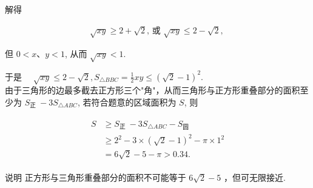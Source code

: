 \documentclass[10pt]{article}
\begin{document}
解得

\begin{align*}
\sqrt{x y} \geqslant 2+\sqrt{2} \text {, 或 } \sqrt{x y} \leqslant 2-\sqrt{2} \text {, }
\end{align*}

但 $0<x 、 y<1$, 从而 $\sqrt{x y}<1$.

于是 $\quad \sqrt{x y} \leqslant 2-\sqrt{2}, S_{\triangle B B C}=\frac{1}{2} x y \leqslant(\sqrt{2}-1)^{2}$.\\
由于三角形的边最多截去正方形三个"角"，从而三角形与正方形重叠部分的面积至少为 $S_{\text {正 }}-3 S_{\triangle A B C}$, 若符合题意的区域面积为 $S$, 则

\begin{align*}
\begin{aligned}
S & \geqslant S_{\text {正 }}-3 S_{\triangle A B C}-S_{\text {圆 }} \\
& \geqslant 2^{2}-3 \times(\sqrt{2}-1)^{2}-\pi \times 1^{2} \\
& =6 \sqrt{2}-5-\pi>0.34 .
\end{aligned}
\end{align*}

说明 正方形与三角形重叠部分的面积不可能等于 $6 \sqrt{2}-5$ ，但可无限接近.
\end{document}
